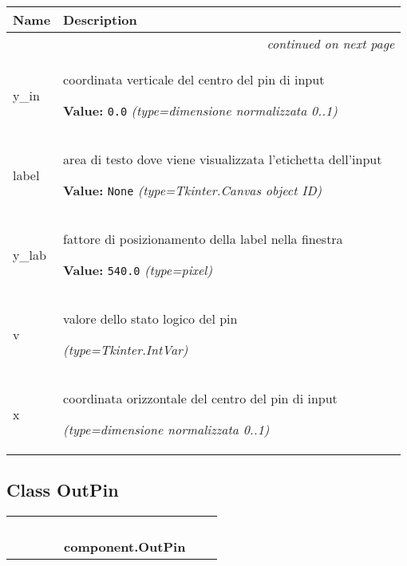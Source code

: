     \vspace{-1cm}
\hspace{\varindent}\begin{longtable}{|p{\varnamewidth}|p{\vardescrwidth}|l}
\cline{1-2}
\cline{1-2} \centering \textbf{Name} & \centering \textbf{Description}& \\
\cline{1-2}
\endhead\cline{1-2}\multicolumn{3}{r}{\small\textit{continued on next page}}\\\endfoot\cline{1-2}
\endlastfoot\raggedright y\-\_\-i\-n\- & \raggedright coordinata verticale del centro del pin di input

\textbf{Value:} 
{\tt 0.0}            {\it (type=dimensione normalizzata 0..1)}&\\
\cline{1-2}
\raggedright l\-a\-b\-e\-l\- & \raggedright area di testo dove viene visualizzata l'etichetta dell'input

\textbf{Value:} 
{\tt None}            {\it (type=Tkinter.Canvas object ID)}&\\
\cline{1-2}
\raggedright y\-\_\-l\-a\-b\- & \raggedright fattore di posizionamento della label nella finestra

\textbf{Value:} 
{\tt 540.0}            {\it (type=pixel)}&\\
\cline{1-2}
\raggedright v\- & \raggedright valore dello stato logico del pin

            {\it (type=Tkinter.IntVar)}&\\
\cline{1-2}
\raggedright x\- & \raggedright coordinata orizzontale del centro del pin di input

            {\it (type=dimensione normalizzata 0..1)}&\\
\cline{1-2}
\end{longtable}



\subsection{Class OutPin}

    \label{component:OutPin}
\begin{tabular}{cccccccc}
\multicolumn{2}{r}{\settowidth{\BCL}{object}\multirow{2}{\BCL}{object}}
&&
&&
  \\\cline{3-3}
  &&\multicolumn{1}{c|}{}
&&
&&
  \\
\multicolumn{4}{r}{\settowidth{\BCL}{component.Component}\multirow{2}{\BCL}{component.Component}}
&&
  \\\cline{5-5}
  &&&&\multicolumn{1}{c|}{}
&&
  \\
&&&&\multicolumn{2}{l}{\textbf{component.OutPin}}
\end{tabular}

